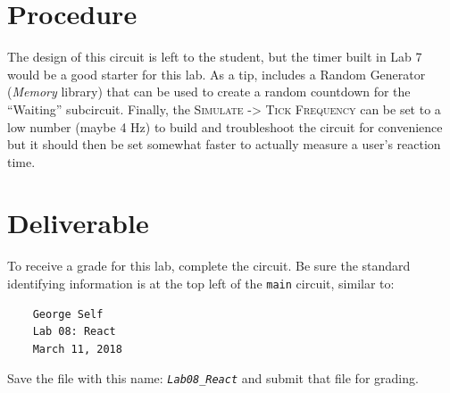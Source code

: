 \section{Procedure}

The design of this circuit is left to the student, but the timer built in Lab 7 would be a good starter for this lab. As a tip, \LE includes a Random Generator (\textit{Memory} library) that can be used to create a random countdown for the ``Waiting'' subcircuit. Finally, the \textsc{Simulate -> Tick Frequency} can be set to a low number (maybe 4 Hz) to build and troubleshoot the circuit for convenience but it should then be set somewhat faster to actually measure a user's reaction time.

\section{Deliverable}

To receive a grade for this lab, complete the circuit. Be sure the standard identifying information is at the top left of the \lstinline{main} circuit, similar to: 

\bigskip
\begin{minipage}{\linewidth}
	\begin{verbatim}
	George Self
	Lab 08: React
	March 11, 2018
	\end{verbatim}
\end{minipage}
\bigskip

Save the file with this name: \emph{\texttt{Lab08\_React}} and submit that file for grading.

